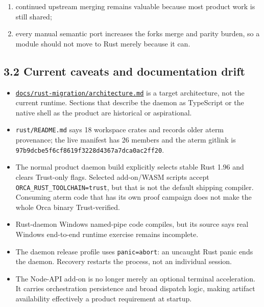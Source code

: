 \documentclass[
  10pt,
  letterpaper,
]{article}
\providecommand{\tightlist}{%
  \setlength{\itemsep}{0pt}\setlength{\parskip}{0pt}}
\begin{document}
\begin{enumerate}
\def\labelenumi{\arabic{enumi}.}
\tightlist
\item
  continued upstream merging remains valuable because most product work
  is still shared;
\item
  every manual semantic port increases the fork\textquotesingle s merge
  and parity burden, so a module should not move to Rust merely because
  it can.
\end{enumerate}

\subsection{3.2 Current caveats and documentation
drift}\label{32-current-caveats-and-documentation-drift}

\begin{itemize}
\tightlist
\item
  \href{https://github.com/andrewyatesai/orca-alab/blob/d3ba1bcb17324714a838b2970e04fcd96989e84f/docs/rust-migration/architecture.md}{\texttt{docs/rust-migration/architecture.md}}
  is a target architecture, not the current runtime. Sections that
  describe the daemon as TypeScript or the native shell as the product
  are historical or aspirational.
\item
  \texttt{rust/README.md} says 18 workspace crates and records older
  aterm provenance; the live manifest has 26 members and the aterm
  gitlink is \texttt{97b9dcbe5f6cf8619f3228d4367a7dca0ac2ff20}.
\item
  The normal product daemon build explicitly selects stable Rust 1.96
  and clears Trust-only flags. Selected add-on/WASM scripts accept
  \texttt{ORCA\_RUST\_TOOLCHAIN=trust}, but that is not the default
  shipping compiler. Consuming aterm code that has its own proof
  campaign does not make the whole Orca binary Trust-verified.
\item
  Rust-daemon Windows named-pipe code compiles, but its source says real
  Windows end-to-end runtime exercise remains incomplete.
\item
  The daemon release profile uses \texttt{panic=abort}: an uncaught Rust
  panic ends the daemon. Recovery restarts the process, not an individual
  session.
\item
  The Node-API add-on is no longer merely an optional terminal
  acceleration. It carries orchestration persistence and broad dispatch
  logic, making artifact availability effectively a product requirement
  at startup.
\end{itemize}
\end{document}
